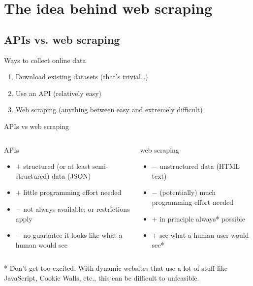 \section{The idea behind web scraping}
\subsection{APIs vs. web scraping}

\begin{frame}{Ways to collect online data}
  \begin{enumerate}
  \item Download existing datasets (that's trivial\ldots)
  \item Use an API (relatively easy)
  \item Web scraping (anything between easy and extremely difficult)
  \end{enumerate}
\end{frame}


\begin{frame}{APIs vs web scraping}
  \begin{columns}[t]
    \begin{block}{APIs}
      \begin{itemize}
      \item $+$ structured (or at least semi-structured) data (JSON)
      \item $+$ little programming effort needed
      \item $-$ not always available; or restrictions apply
      \item $-$ no guarantee it looks like what a human would see
      \end{itemize}
    \end{block}
    \pause
    \begin{alertblock}{web scraping}
      \begin{itemize}
      \item $-$ unstructured data (HTML text)
      \item $-$ (potentially) much programming effort needed
      \item $+$ in principle always* possible
      \item $+$ see what a human user would see*
      \end{itemize}
    \end{alertblock}
  \end{columns}

* \footnotesize{Don't get too excited. With dynamic websites that use a lot of stuff like JavaScript, Cookie Walls, etc., this can be difficult to unfeasible.}
\end{frame}


